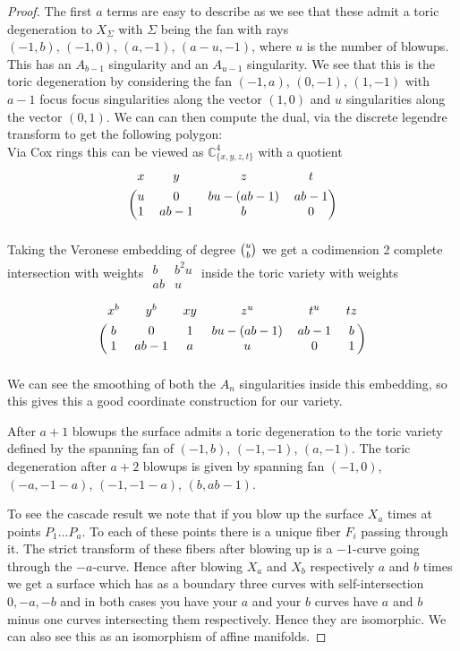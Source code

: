 \documentclass[12pt,a4paper]{book}      %
\theoremstyle{definition}
\newcommand{\mb}[1]{\mathbb{#1}}
\begin{document}
\begin{proof}
The first $a$ terms are easy to describe as we see that these admit a toric degeneration to $X_\Sigma$ with $\Sigma$ being the fan with rays $(-1, b), \, (-1, 0), \, (a, -1), \, (a-u, -1)$, where $u$ is the number of blowups. This has an $A_{b-1}$ singularity and an $A_{u-1}$ singularity. We see that this is the toric degeneration by considering the fan $(-1, a)$, $(0, -1)$, $(1,-1)$ with $a-1$ focus focus singularities along the vector $(1,0)$ and $u$ singularities along the vector $(0,1)$. We can can then compute the dual, via the discrete legendre transform to get the following polygon:
\[
\]
Via Cox rings this can be viewed as $\mb{C}^4_{\{x, y,z,t\}}$ with a quotient 
\[
\begin{blockarray}{cccc}
	x & y & z & t \\[4pt]
      \begin{block}{(cccc)}
		u & 0 & bu - (ab-1) & ab-1 \\
		1 & ab-1 & b & 0 \\
      \end{block}
\end{blockarray}
\]
Taking the Veronese embedding of degree $\begin{binom}{u}{b} \end{binom}$ we get a codimension 2 complete intersection with weights
$\begin{matrix} b & b^2u \\ ab & u \end{matrix}$ 
inside the toric variety with weights

\[
\begin{blockarray}{ccc ccc}
	x^b & y^b & xy & z^u  & t^u & tz \\[4pt]
      \begin{block}{(ccc ccc)}
		b & 0 & 1 & bu - (ab-1) & ab-1 & b\\
		1 & ab-1  & a & u & 0 & 1\\
      \end{block}
\end{blockarray}
\]
We can see the smoothing of both the $A_n$ singularities inside this embedding, so this gives this a good coordinate construction for our variety.

 After $a+1$ blowups the surface admits a toric degeneration to the toric variety defined by the spanning fan of $(-1, b)$, $(-1, -1)$, $(a, -1)$. The toric degeneration after $a+2$ blowups is given by spanning fan $(-1,0)$, $(-a, -1-a)$, $(-1, -1-a)$, $(b, ab-1)$. 

To see the cascade result we note that if you blow up the surface $X_a$ times at points $P_1 \dots P_a$. To each of these points there is a unique fiber $F_i$ passing through it. The strict transform of these fibers after blowing up is a $-1$-curve going through the $-a$-curve. Hence after blowing $X_a$ and $X_b$ respectively $a$ and $b$ times we get a surface which has as a boundary three curves with self-intersection $0, -a, -b$ and in both cases you have your $a$ and your $b$ curves have $a$ and $b$ minus one curves intersecting them respectively. Hence they are isomorphic. We can also see this as an isomorphism of affine manifolds.
 

\end{proof}
\end{document}
